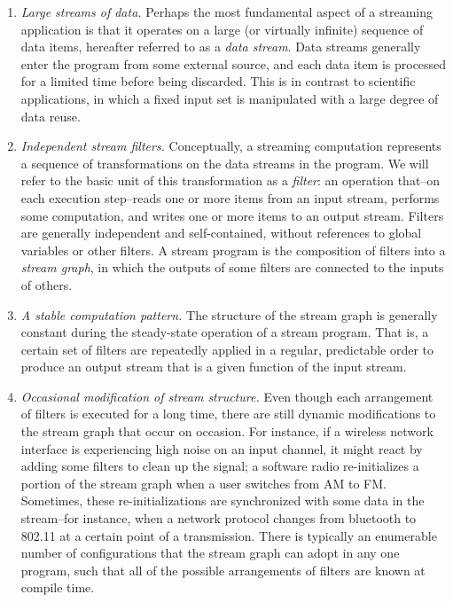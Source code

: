 \begin{enumerate}
\item {\it Large streams of data.}  Perhaps the most fundamental
aspect of a streaming application is that it operates on a large (or
virtually infinite) sequence of data items, hereafter referred to as a
{\it data stream}.  Data streams generally enter the program from some
external source, and each data item is processed for a limited time
before being discarded.  This is in contrast to scientific
applications, in which a fixed input set is manipulated with a large
degree of data reuse.

\item {\it Independent stream filters.}  Conceptually, a streaming computation
represents a sequence of transformations on the data streams in the
program.  We will refer to the basic unit of this transformation as a
{\it filter}: an operation that--on each execution step--reads one or
more items from an input stream, performs some computation, and writes
one or more items to an output stream.  Filters are generally
independent and self-contained, without references to global variables
or other filters.  A stream program is the composition of filters into
a {\it stream graph}, in which the outputs of some filters are
connected to the inputs of others.

\item {\it A stable computation pattern.}  The structure of the stream
graph is generally constant during the steady-state operation of a
stream program.  That is, a certain set of filters are repeatedly
applied in a regular, predictable order to produce an output stream
that is a given function of the input stream.

\item {\it Occasional modification of stream structure.}  Even though each
arrangement of filters is executed for a long time, there are still
dynamic modifications to the stream graph that occur on occasion.  For
instance, if a wireless network interface is experiencing high noise
on an input channel, it might react by adding some filters to clean up
the signal; a software radio re-initializes a portion of the stream
graph when a user switches from AM to FM.  Sometimes, these
re-initializations are synchronized with some data in the stream--for
instance, when a network protocol changes from bluetooth to 802.11 at
a certain point of a transmission.  There is typically an enumerable
number of configurations that the stream graph can adopt in any one
program, such that all of the possible arrangements of filters are
known at compile time.


\end{enumerate}
